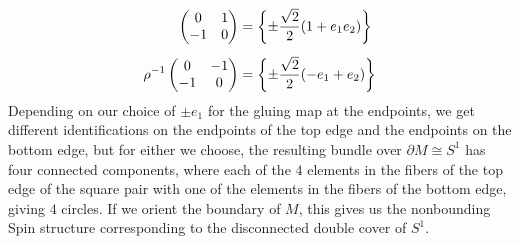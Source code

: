 \begin{exmp}
\begin{align*}
\begin{pmatrix}
0 & 1 \\
-1 & 0
\end{pmatrix} &= \left\lbrace \pm\frac{\sqrt{2}}{2}(1 + e_1e_2) \right\rbrace \\[5pt]
\rho^{-1}\begin{pmatrix}
0 & -1 \\
-1 & 0
\end{pmatrix} &= \left\lbrace \pm\frac{\sqrt{2}}{2}(-e_1 + e_2) \right\rbrace
\end{align*}
%
Depending on our choice of $\pm e_1$ for the gluing map at the endpoints, we
get different identifications on the endpoints of the top edge and the
endpoints on the bottom edge, but for either we choose, the resulting bundle
over $\partial M \cong S^1$ has four connected components, where each of the
$4$ elements in the fibers of the top edge of the square pair with one of the
elements in the fibers of the bottom edge, giving $4$ circles. If we orient
the boundary of $M$, this gives us the nonbounding Spin structure corresponding
to the disconnected double cover of $S^1$. \\


\end{exmp}
